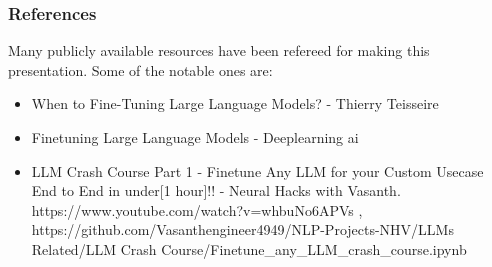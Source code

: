 \begin{frame}\frametitle{References}
Many publicly available resources have been refereed for making this presentation. Some of the notable ones are:
\footnotesize
\begin{itemize}
\item When to Fine-Tuning Large Language Models? - Thierry Teisseire
\item Finetuning Large Language Models - Deeplearning ai
\item LLM Crash Course Part 1 - Finetune Any LLM for your Custom Usecase End to End in under[1 hour]!! - Neural Hacks with Vasanth. https://www.youtube.com/watch?v=whbuNo6APVs  ,  https://github.com/Vasanthengineer4949/NLP-Projects-NHV/LLMs Related/LLM Crash Course/Finetune\_any\_LLM\_crash\_course.ipynb
\end{itemize}

\end{frame}